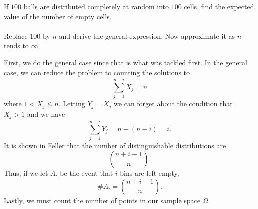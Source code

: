 \begin{problem}[Handout 1, \# 20]
  If \(100\) balls are distributed completely at random into \(100\) cells,
  find the expected value of the number of empty cells.
  \\\\
  Replace \(100\) by \(n\) and derive the general expression. Now
  approximate it as \(n\) tends to \(\infty\).
\end{problem}
\begin{solution}
  First, we do the general case since that is what was tackled first. In
  the general case, we can reduce the problem to counting the solutions to
  \[
    \sum_{j=1}^{n-i}X_j=n
  \]
  where \(1<X_j\leq n\). Letting \(Y_j=X_j\) we can forget about the
  condition that \(X_j>1\) and we have
  \[
    \sum_{j=1}^{n-i}Y_j=n-(n-i)=i.
  \]
  It is shown in Feller that the number of distinguishable distributions
  are
  \[
    \binom{n+i-1}{n}.
  \]
  Thus, if we let \(A_i\) be the event that \(i\) bins are left empty,
  \[
    \# A_i=\binom{n+i-1}{n}.
  \]
  Lastly, we must count the number of points in our sample space
  \(\Omega\).
\end{solution}

